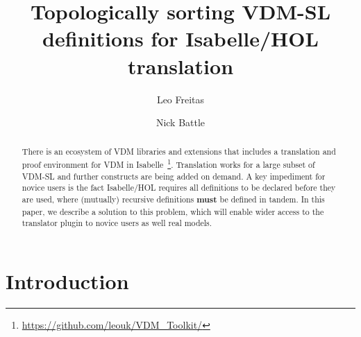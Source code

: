 \documentclass[runningheads,a4paper]{llncs}
\begin{document}
%



\title{Topologically sorting VDM-SL definitions for Isabelle/HOL translation}

\author{Leo Freitas \and Nick Battle
}
\authorrunning{ }

			
\maketitle
\setcounter{footnote}{0} 
\begin{abstract}
    There is an ecosystem of VDM libraries and extensions that includes a translation and proof environment for VDM in Isabelle~\footnote{\url{https://github.com/leouk/VDM_Toolkit/}}. Translation works for a large subset of VDM-SL and
    further constructs are being added on demand. A key impediment for novice users is the fact Isabelle/HOL requires 
    all definitions to be declared before they are used, where (mutually) recursive definitions \textbf{must} be defined in tandem. In this paper, we describe a solution to this problem, which will enable wider access to the translator plugin to novice users as well real models.   
\end{abstract}


\section{Introduction}\label{sec:intro}
\end{document}
